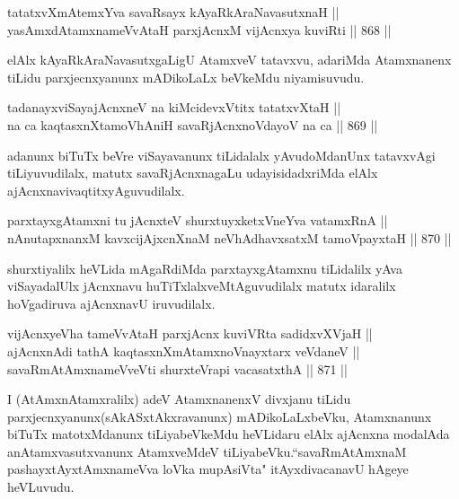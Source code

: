 
\begin{shl}
tatatxvXmAtemxYva savaRsayx kAyaRkAraNavasutxnaH || \\
yasAmxdAtamxnameVvAtaH parxjAcnxM vijAcnxya kuviRti \hfill || 868 ||  
\end{shl}

\begin{artha}
elAlx kAyaRkAraNavasutxgaLigU AtamxveV tatavxvu, adariMda Atamxnanenx tiLidu parxjecnxyanunx mADikoLaLx beVkeMdu niyamisuvudu.
\end{artha}

\begin{shl}
tadanayxviSayajAcnxneV na kiMcidevxVtitx tatatxvXtaH || \\
na ca kaqtasxnXtamoVhAniH savaRjAcnxnoVdayoV na ca \hfill || 869 ||  
\end{shl}

\begin{artha}
adanunx biTuTx beVre viSayavanunx tiLidalalx yAvudoMdanUnx tatavxvAgi tiLiyuvudilalx, matutx savaRjAcnxnagaLu udayisidadxriMda elAlx ajAcnxnavivaqtitxyAguvudilalx.
\end{artha}


\begin{shl}
parxtayxgAtamxni tu jAcnxteV shurxtuyxketxVneYva vatamxRnA || \\
nAnutapxnanxM kavxcijAjxcnXnaM neVhAdhavxsatxM tamoV\s payxtaH \hfill || 870 ||  
\end{shl}

\begin{artha}
shurxtiyalilx heVLida mAgaRdiMda parxtayxgAtamxnu tiLidalilx yAva viSayadalUlx jAcnxnavu huTiTxlalxveMtAguvudilalx matutx idaralilx hoVgadiruva ajAcnxnavU iruvudilalx.
\end{artha}


\begin{shl}
vijAcnxyeVha tameVvAtaH parxjAcnx kuviVRta sadidxvXVjaH || \\
ajAcnxnAdi tathA kaqtasxnXmAtamxnoV\s nayxtarx veVdaneV || \\
savaRmAtAmxnameVveVti shurxteVrapi vacasatxthA \hfill || 871 ||  
\end{shl}

\begin{artha}
I (AtAmxnAtamxralilx) adeV AtamxnanenxV divxjanu tiLidu parxjecnxyanunx(sAkASxtAkxravanunx) mADikoLaLxbeVku, Atamxnanunx biTuTx matotxMdanunx tiLiyabeVkeMdu heVLidaru elAlx ajAcnxna modalAda anAtamxvasutxvanunx AtamxveMdeV tiLiyabeVku.``savaRmAtAmxnaM pashayxtAyxtAmxnameVva loVka mupAsiVta" itAyxdivacanavU hAgeye heVLuvudu.
\end{artha}

